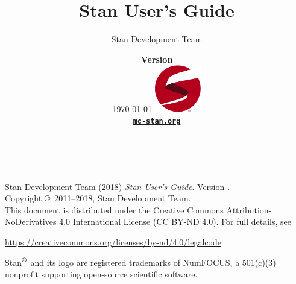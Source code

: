 \title{\Huge\bf Stan User's Guide\vspace*{-12pt}}
\author{\vspace*{-12pt}\Large Stan Development Team}

\date{\vspace*{24pt}
{\large\bfseries Version \stanversion}
\\[6pt] 
{\small \today}
\vfill
\includegraphics[width=0.8in]{img/logo-tm.pdf}
\\[-2pt]
{\small\bfseries \href{http://mc-stan.org/}{\tt mc-stan.org}}
}
\maketitle

\newpage
\thispagestyle{empty}
\mbox{ }
\vfill
\begin{center}
\begin{minipage}[t]{0.75\textwidth}
\small
Stan Development Team (2018)
{\it Stan User's Guide}. Version
\stanversion.
\vspace*{20pt}
\mbox{ }
\\
Copyright \copyright \ 2011--2018, Stan Development Team.
\vspace*{28pt}
\mbox{} \\
This document is distributed under the Creative Commons
Attribution-NoDerivatives 4.0 International License (CC BY-ND 4.0).
For full details, see
\begin{center}
\url{https://creativecommons.org/licenses/by-nd/4.0/legalcode}
\end{center}
Stan\hspace*{-1pt}$^{\mbox{\footnotesize\vspace*{-1.5pt}\textregistered}}$ and its logo are
registered trademarks of NumFOCUS, a 501(c)(3) nonprofit supporting
open-source scientific software.
\end{minipage}
\vspace*{24pt}
\mbox{ }
\end{center}
